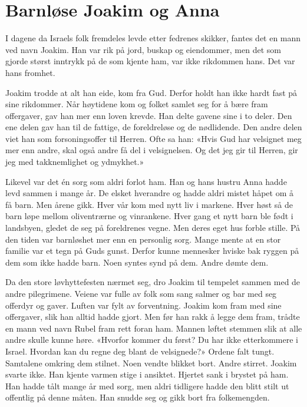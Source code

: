 \chapter{Barnløse Joakim og Anna}

I dagene da Israels folk fremdeles levde etter fedrenes skikker,
fantes det en mann ved navn Joakim. Han var rik på jord,
buskap og eiendommer, men det som gjorde størst inntrykk
på de som kjente ham, var ikke rikdommen hans. Det var hans fromhet.

Joakim trodde at alt han eide, kom fra Gud. Derfor holdt han ikke
hardt fast på sine rikdommer. Når høytidene kom og folket samlet
seg for å bære fram offergaver, gav han mer enn loven krevde.
Han delte gavene sine i to deler.
Den ene delen gav han til de fattige, de foreldreløse og de nødlidende.
Den andre delen viet han som forsoningsoffer til Herren.
Ofte sa han: «Hvis Gud har velsignet meg mer enn andre,
skal også andre få del i velsignelsen. Og det jeg gir til Herren,
gir jeg med takknemlighet og ydmykhet.»  

Likevel var det én sorg som aldri forlot ham.
Han og hans hustru Anna hadde levd sammen i mange år.
De elsket hverandre og hadde aldri mistet håpet om å få barn.
Men årene gikk. Hver vår kom med nytt liv i markene.
Hver høst så de barn løpe mellom oliventrærne og vinrankene.
Hver gang et nytt barn ble født i landsbyen,
gledet de seg på foreldrenes vegne.
Men deres eget hus forble stille.
På den tiden var barnløshet mer enn en personlig sorg.
Mange mente at en stor familie var et tegn på Guds gunst.
Derfor kunne mennesker hviske bak ryggen på
dem som ikke hadde barn. Noen syntes synd på dem. Andre dømte dem.

Da den store løvhyttefesten  nærmet seg, dro Joakim til tempelet sammen
med de andre pilegrimene. Veiene var fulle av folk som sang
salmer og bar med seg offerdyr og gaver. Luften var fylt av forventning.
Joakim kom fram med sine offergaver, slik han alltid hadde gjort.
Men før han rakk å legge dem fram, trådte en mann ved navn
Rubel fram rett foran ham. Mannen løftet stemmen slik at alle andre skulle
kunne høre.
 «Hvorfor kommer du først? Du har ikke etterkommere i Israel.
Hvordan kan du regne deg blant de velsignede?»  
Ordene falt tungt.
Samtalene omkring dem stilnet. Noen vendte blikket bort. Andre stirret.
Joakim svarte ikke.
Han kjente varmen stige i ansiktet. Hjertet sank i brystet på ham.
Han hadde tålt mange år med sorg, men aldri tidligere hadde
den blitt stilt ut offentlig på denne måten.
Han snudde seg og gikk bort fra folkemengden.

